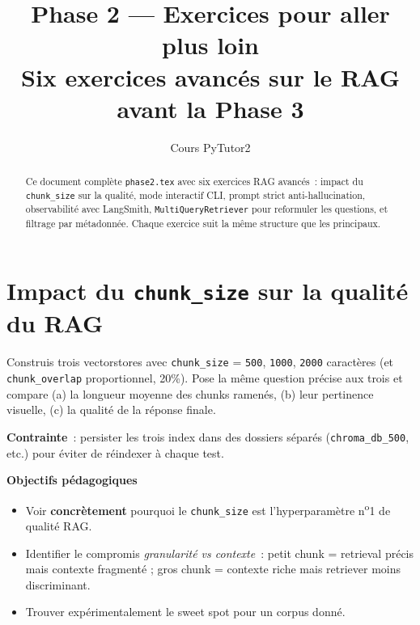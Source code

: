 \documentclass[11pt,a4paper]{article}
\title{\textbf{Phase 2 — Exercices pour aller plus loin}\\
\large Six exercices avancés sur le RAG avant la Phase 3}
\author{Cours PyTutor2}
\date{}
\begin{document}
\maketitle

\begin{abstract}
\noindent
Ce document complète \texttt{phase2.tex} avec six exercices RAG
avancés~: impact du \texttt{chunk\_size} sur la qualité, mode interactif
CLI, prompt strict anti-hallucination, observabilité avec LangSmith,
\texttt{MultiQueryRetriever} pour reformuler les questions, et filtrage
par métadonnée. Chaque exercice suit la même structure que les principaux.
\end{abstract}

\tableofcontents
\bigskip

\section{Impact du \texttt{chunk\_size} sur la qualité du RAG}

\begin{tcolorbox}[title=Exercice bonus 1. Mesurer expérimentalement l'effet du découpage]
Construis trois vectorstores avec \texttt{chunk\_size} = \texttt{500},
\texttt{1000}, \texttt{2000} caractères (et \texttt{chunk\_overlap}
proportionnel, 20\%). Pose la même question précise aux trois et compare
(a) la longueur moyenne des chunks ramenés, (b) leur pertinence visuelle,
(c) la qualité de la réponse finale.

\textbf{Contrainte}~: persister les trois index dans des dossiers
séparés (\texttt{chroma\_db\_500}, etc.) pour éviter de réindexer à
chaque test.

\bigskip
\noindent\textbf{Objectifs pédagogiques}
\begin{itemize}[leftmargin=*]
  \item Voir \textbf{concrètement} pourquoi le \texttt{chunk\_size} est
        l'hyperparamètre n\textsuperscript{o}1 de qualité RAG.
  \item Identifier le compromis \emph{granularité vs contexte}~: petit
        chunk = retrieval précis mais contexte fragmenté ; gros chunk =
        contexte riche mais retriever moins discriminant.
  \item Trouver expérimentalement le sweet spot pour un corpus donné.
\end{itemize}
\end{tcolorbox}
\end{document}
